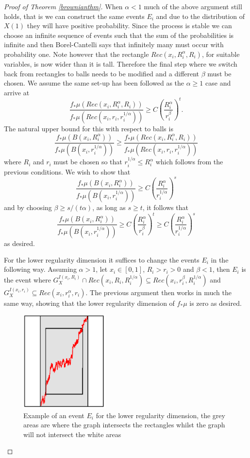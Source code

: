 \begin{proof}[Proof of Theorem \ref{brownianthm}]
When $\alpha < 1$ much of the above argument still holds, that is we can construct the same events $E_i$ and due to the distribution of $X(1)$ they will have positive probability. Since the process is stable we can choose an infinite sequence of events such that the sum of the probabilities is infinite and then Borel-Cantelli says that infinitely many must occur with probability one. Note however that the rectangle $Rec(x_i, R_i^{\alpha}, R_i)$, for suitable variables, is now wider than it is tall. Therefore the final step where we switch back from rectangles to balls needs to be modified and a different $\beta$ must be chosen. We assume the same set-up has been followed as the $\alpha \ge 1$ case and arrive at
\[
\frac{f_*\mu(Rec(x_i,R_i^{\alpha}, R_i))}{f_*\mu(Rec(x_i,r_i, r_i^{1/\alpha}))} \ge C \left( \frac{R_i^{\alpha}}{r_i^{\beta}} \right) ^t.
\]
The natural upper bound for this with respect to balls is 
\[
\frac{f_*\mu(B(x_i, R_i^{\alpha}))}{f_*\mu(B(x_i,r_i^{1/\alpha}))} \ge \frac{f_*\mu(Rec(x_i,R_i^{\alpha}, R_i))}{f_*\mu(Rec(x_i,r_i, r_i^{1/\alpha}))}
\]
where $R_i$ and $r_i$ must be chosen so that $r_i^{1/\alpha}  \le R_i^{\alpha}$ which follows from the previous conditions. We wish to show that 
\[
\frac{f_*\mu(B(x_i, R_i^{\alpha}))}{f_*\mu(B(x_i,r_i^{1/\alpha}))} \ge C \left( \frac{R_i^{\alpha}}{r_i^{1/\alpha}} \right)^s
\]
and by choosing $\beta \ge s/ (t\alpha)$, as long as $s \ge t$, it follows that
\[
\frac{f_*\mu(B(x_i, R_i^{\alpha}))}{f_*\mu(B(x_i,r_i^{1/\alpha}))} \ge C \left( \frac{R_i^{\alpha}}{r_i^{\beta}} \right) ^t \ge C \left(\frac{R_i^{\alpha}}{r_i^{1/\alpha}}\right)^s
\]
as desired.

For the lower regularity dimension it suffices to change the events $E_i$ in the following way. Assuming $\alpha>1$, let $x_i \in [0,1]$, $R_i > r_i > 0$ and $\beta < 1$, then $E_i$ is the event where $G_X^{I(x_i, R_i)} \cap Rec(x_i,R_i,R_i^{1/\alpha}) \subseteq Rec(x_i, r_i^{\beta}, R_i^{1/\alpha})$ and $G_X^{I(x_i, r_i)} \subseteq Rec(x_i, r_i^{\alpha}, r_i)$. The previous argument then works in much the same way, showing that the lower regularity dimension of $f_*\mu$ is zero as desired.

\begin{figure}[htbp]
	\centering
	\includegraphics[width=0.4\textwidth]{pics/ch-brownian/rectangles.png}
	\caption{Example of an event $E_i$ for the lower regularity dimension, the grey areas are where the graph intersects the rectangles whilst the graph will not intersect the white areas}
	\label{brownian_event_lower}
\end{figure}


\end{proof}



